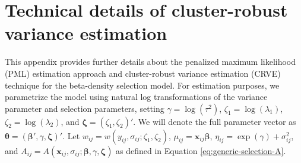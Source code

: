 \documentclass[
  american,
  man, donotrepeattitle,floatsintext]{apa7}
\begin{document}
\section{Technical details of cluster-robust variance estimation}\label{CRVE-details}

This appendix provides further details about the penalized maximum likelihood (PML) estimation approach and cluster-robust variance estimation (CRVE) technique for the beta-density selection model. For estimation purposes, we parametrize the model using natural log transformations of the variance parameter and selection parameters, setting \(\gamma = \log(\tau^2)\), \(\zeta_1 = \log(\lambda_1)\), \(\zeta_2 = \log(\lambda_2)\), and \(\boldsymbol\zeta = (\zeta_1, \zeta_2)'\). We will denote the full parameter vector as \(\boldsymbol\theta = \left(\boldsymbol\beta', \gamma, \boldsymbol\zeta\right)'\).
Let \(w_{ij} = w\left(y_{ij}, \sigma_{ij}; \zeta_1, \zeta_2 \right)\), \(\mu_{ij} = \mathbf{x}_{ij} \boldsymbol\beta\), \(\eta_{ij} = \exp(\gamma) + \sigma_{ij}^2\), and \(A_{ij} = A\left(\mathbf{x}_{ij}, \sigma_{ij}; \boldsymbol\beta, \gamma, \boldsymbol\zeta \right)\) as defined in Equation \eqref{eq:generic-selection-A}.
\end{document}
